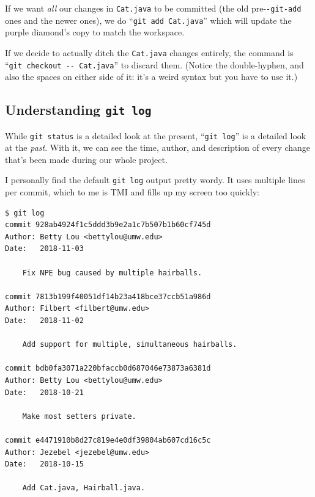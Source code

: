 \begin{itemize}
\begin{compactitem}
\item If we want \textit{all} our changes in \texttt{Cat.java} to be committed
(the old pre-\texttt{-git-add} ones and the newer ones), we do ``\texttt{git
add Cat.java}'' which will update the purple diamond's copy to match the
workspace.

\item If we decide to actually ditch the \texttt{Cat.java} changes entirely,
the command is ``\texttt{git checkout -{}- Cat.java}'' to discard them.
(Notice the double-hyphen, and also the spaces on either side of it: it's a
weird syntax but you have to use it.)

\end{compactitem}

\end{itemize}

\subsection{Understanding \texttt{git log}}

While \texttt{git status} is a detailed look at the present, ``\texttt{git
log}'' is a detailed look at the \textit{past}. With it, we can see the time,
author, and description of every change that's been made during our whole
project.

I personally find the default \texttt{git log} output pretty wordy. It uses
multiple lines per commit, which to me is TMI and fills up my screen too
quickly:

\begin{Verbatim}[fontsize=\footnotesize,samepage=true,frame=single]
$ git log
commit 928ab4924f1c5ddd3b9e2a1c7b507b1b60cf745d
Author: Betty Lou <bettylou@umw.edu>
Date:   2018-11-03

    Fix NPE bug caused by multiple hairballs.

commit 7813b199f40051df14b23a418bce37ccb51a986d
Author: Filbert <filbert@umw.edu>
Date:   2018-11-02

    Add support for multiple, simultaneous hairballs.

commit bdb0fa3071a220bfaccb0d687046e73873a6381d
Author: Betty Lou <bettylou@umw.edu>
Date:   2018-10-21

    Make most setters private.

commit e4471910b8d27c819e4e0df39804ab607cd16c5c
Author: Jezebel <jezebel@umw.edu>
Date:   2018-10-15

    Add Cat.java, Hairball.java.
\end{Verbatim}

